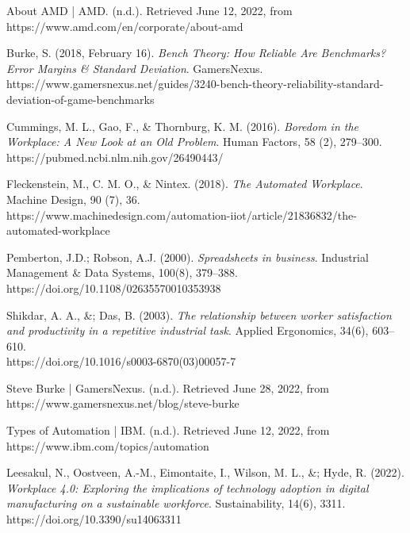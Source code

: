 \documentclass[12pt]{article}
\begin{document}



About AMD | AMD. (n.d.). Retrieved June 12, 2022, from \\
https://www.amd.com/en/corporate/about-amd 

Burke, S. (2018, February 16). \emph{Bench Theory: How Reliable Are Benchmarks? Error Margins \& Standard Deviation}. GamersNexus. \\ https://www.gamersnexus.net/guides/3240-bench-theory-reliability-standard-deviation-of-game-benchmarks

Cummings, M. L., Gao, F., \& Thornburg, K. M. (2016). \emph{Boredom in the Workplace: A New Look at an Old Problem}. Human Factors, 58 (2), 279–300. \\
https://pubmed.ncbi.nlm.nih.gov/26490443/

Fleckenstein, M., C. M. O., \& Nintex. (2018). \emph{The Automated Workplace}. Machine Design, 90 (7), 36. \\
https://www.machinedesign.com/automation-iiot/article/21836832/the-automated-workplace


Pemberton, J.D.; Robson, A.J. (2000). \emph{Spreadsheets in business}. Industrial Management \& Data Systems, 100(8), 379–388. 
\\ https://doi.org/10.1108/02635570010353938 

Shikdar, A. A., \&; Das, B. (2003). \emph{The relationship between worker satisfaction and productivity in a repetitive industrial task}. Applied Ergonomics, 34(6), 603–610. 
\\ https://doi.org/10.1016/s0003-6870(03)00057-7 

Steve Burke | GamersNexus. (n.d.). Retrieved June 28, 2022, from \\
https://www.gamersnexus.net/blog/steve-burke

Types of Automation | IBM. (n.d.). Retrieved June 12, 2022, from \\
https://www.ibm.com/topics/automation

Leesakul, N., Oostveen, A.-M., Eimontaite, I., Wilson, M. L., \&; Hyde, R. (2022). \emph{Workplace 4.0: Exploring the implications of technology adoption in digital manufacturing on a sustainable workforce}. Sustainability, 14(6), 3311. 
\\ https://doi.org/10.3390/su14063311 
\end{document}
